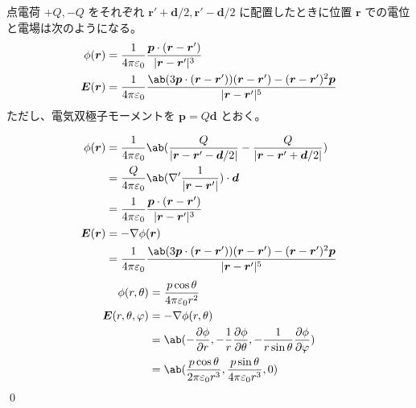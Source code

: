 \documentclass[uplatex,dvipdfmx,a4paper,11pt]{jlreq}
\makeatletter
\newcommand{\EE}{\bm{E}}
\newcommand{\rr}{\bm{r}}
\newcommand{\pp}{\bm{p}}
\newcommand{\vnabla}{\mathbf{\nabla}}
\numberwithin{equation}{section}
\theoremstyle{definition}
\renewenvironment{proof}[1][\proofname]{\par
  \normalfont
  \topsep6\p@\@plus6\p@ \trivlist
  \item[\hskip\labelsep{\bfseries #1}\@addpunct{\bfseries}]\ignorespaces\quad\par
}{%
  \qed\endtrivlist\@endpefalse
}
\renewcommand\proofname{証明}
\makeatother
\begin{document}
\begin{theorem}[電気双極子]
  点電荷 $+Q, -Q$ をそれぞれ $\rr'+\bm{d}/2, \rr'-\bm{d}/2$ に配置したときに位置 $\rr$ での電位と電場は次のようになる。
  \begin{align}
    \phi(\rr) & = \frac{1}{4\pi\varepsilon_0}\frac{\pp\cdot(\rr - \rr')}{|\rr - \rr'|^3}                                       \\
    \EE(\rr)  & = \frac{1}{4\pi\varepsilon_0}\frac{\ab(3\pp\cdot(\rr - \rr'))(\rr - \rr') - (\rr - \rr')^2\pp}{|\rr - \rr'|^5}
  \end{align}
  ただし、電気双極子モーメントを $\pp = Q\bm{d}$ とおく。
\end{theorem}
\begin{proof}
  \begin{align}
    \phi(\rr) & = \frac{1}{4\pi\varepsilon_0}\ab(\frac{Q}{|\rr - \rr' - \bm{d}/2|} - \frac{Q}{|\rr - \rr' + \bm{d}/2|})        \\
              & = \frac{Q}{4\pi\varepsilon_0}\ab(\vnabla'\frac{1}{|\rr - \rr'|})\cdot\bm{d}                                    \\
              & = \frac{1}{4\pi\varepsilon_0}\frac{\pp\cdot(\rr - \rr')}{|\rr - \rr'|^3}                                       \\
    \EE(\rr)  & = -\vnabla\phi(\rr)                                                                                            \\
              & = \frac{1}{4\pi\varepsilon_0}\frac{\ab(3\pp\cdot(\rr - \rr'))(\rr - \rr') - (\rr - \rr')^2\pp}{|\rr - \rr'|^5}
  \end{align}
  \begin{align}
    \phi(r, \theta)       & = \frac{p\cos\theta}{4\pi\varepsilon_0r^2}                                                             \\
    \EE(r,\theta,\varphi) & = -\nabla\phi(r, \theta)                                                                               \\
                          & = \ab(-\diffp{\phi}{r}, -\frac{1}{r}\diffp{\phi}{\theta}, -\frac{1}{r\sin\theta}\diffp{\phi}{\varphi}) \\
                          & = \ab(\frac{p\cos\theta}{2\pi\varepsilon_0r^3}, \frac{p\sin\theta}{4\pi\varepsilon_0r^3}, 0)           \\
  \end{align}
\end{proof}

\begin{theorem}[電気双極子放射]

\end{theorem}
\end{document}

